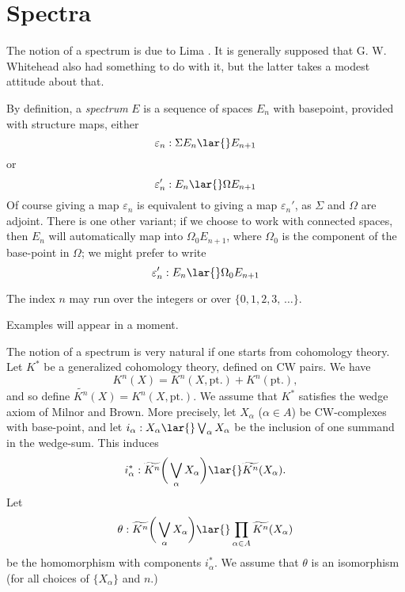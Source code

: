 \documentclass[../main]{subfiles}
\begin{document}
\chapter{Spectra} %
\label{sec:p3ch02}

The notion of a spectrum is due to Lima \cite{lima}. It is generally supposed that G. W. Whitehead also had something to do with it, but the latter takes a modest attitude about that.

By definition, a \emph{spectrum} $E$ is a sequence of spaces $E_n$ with basepoint, provided with structure maps, either
\[
\varepsilon_n: \Sigma   E_n \lar{} E_{n+1}
\]
or
\[
\varepsilon_n': E_n \lar{} \Omega E_{n+1}
\]
Of course giving a map $\varepsilon_n$ is equivalent to giving a map $\varepsilon_n'$, as $\Sigma$ and $\Omega$ are adjoint. There is one other variant; if we choose to work with connected spaces, then $E_n$ will automatically map into $\Omega_0 E_{n+1}$, where $\Omega_0$ is the component of the base-point in $\Omega$; we might prefer to write
\[
\varepsilon_n': E_n \lar{} \Omega_0 E_{n+1}
\]

The index $n$ may run over the integers or over $\{0,1,2,3,\, \hdots\}$.

Examples will appear in a moment.

The notion of a spectrum is very natural if one starts from cohomology theory. Let $K^\ast$ be a generalized cohomology theory, defined on CW pairs. We have
\[
K^n(X) = K^n(X, \mathrm{pt.}) + K^n(\mathrm{pt.}),
\]
and so define $\widetilde{K^n}(X) = K^n(X, \mathrm{pt.})$. We assume that $K^\ast$ satisfies the wedge axiom of Milnor and Brown. More precisely, let $X_\alpha$ ($\alpha\in A$) be CW-complexes with base-point, and let $i_\alpha: X_\alpha \lar{} \bigvee_\alpha X_\alpha$ be the inclusion of one summand in the wedge-sum. This induces
\[
i_\alpha^\ast:
\widetilde{K^n} \bigg( \bigvee_\alpha X_\alpha \bigg) \lar{} \widetilde{K^n}(X_\alpha).
\]
Let
\[
\theta: 
\widetilde{K^n} \bigg( \bigvee_\alpha X_\alpha \bigg) \lar{} \prod_{\alpha\in A} \widetilde{K^n}(X_\alpha)
\]
be the homomorphism with components $i_\alpha^\ast$. We assume that $\theta$ is an isomorphism (for all choices of $\{X_\alpha\}$ and $n$.)
\end{document}
